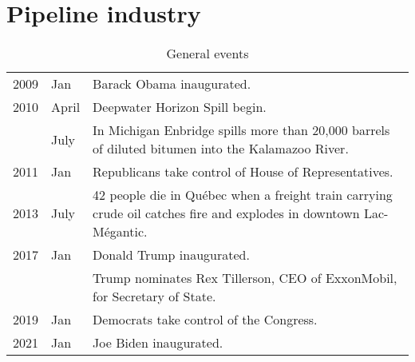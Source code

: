 
\section*{Pipeline industry}

\begin{table}[H]
	\caption{General events}

	\begin{tabularx}{\textwidth}{r @{\hspace{0.5\tabcolsep}} l |@{\timeline} X}
		\toprule

		2009 & Jan & Barack Obama inaugurated.\\

		2010 & April & Deepwater Horizon Spill begin.\\

		 & July & In Michigan Enbridge spills more than 20,000 barrels of diluted bitumen into the Kalamazoo River.\\

		2011 & Jan & Republicans take control of House of Representatives.\\

		2013 & July & 42 people die in Québec when a freight train carrying crude oil catches fire and explodes in downtown Lac-Mégantic.\\

		2017 & Jan & Donald Trump inaugurated.\\

		 & & Trump nominates Rex Tillerson, CEO of ExxonMobil, for Secretary of State.\\

		2019 & Jan & Democrats take control of the Congress.\\

		2021 & Jan & Joe Biden inaugurated.\\

	\end{tabularx}

\end{table}
